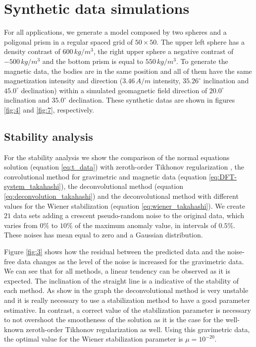 \section{Synthetic data simulations}
\label{sec:synthetic_simulations}

For all applications, we generate a model composed by two spheres and a poligonal prism in a regular spaced grid of $50 \times 50$. The upper left sphere has a density contrast of $600 \, kg/m^3$, the right upper sphere a negative contrast of $-500 \, kg/m^3$ and the bottom prism is equal to $550 \, kg/m^3$. To generate the magnetic data, the bodies are in the same position and all of them have the same magnetization intensity and direction ($3.46 \, A/m$ intensity, $35.26^{\circ}$ inclination and $45.0^{\circ}$ declination) within a simulated geomagnetic field direction of $20.0^{\circ}$ inclination and $35.0^{\circ}$ declination. These synthetic datas are shown in figures \ref{fig:4}
and \ref{fig:7}, respectively.

\subsection{Stability analysis}

For the stability analysis we show the comparison of the normal equations solution (equation \ref{eq:t_data}) with zeroth-order Tikhonov regularization \citep{aster2018parameter}, the convolutional method for gravimetric and magnetic data (equation \ref{eq:DFT-system_takahashi}), the deconvolutional method (equation \ref{eq:deconvolution_takahashi}) and the deconvolutional method with different values for the Wiener stabilization (equation \ref{eq:wiener_takahashi}). We create $21$ data sets adding a crescent pseudo-random noise to the original data, which varies from $0\%$ to $10\%$ of the maximum anomaly value, in intervals of $0.5\%$. These noises has mean equal to zero and a Gaussian distribution.
		
Figure \ref{fig:3} shows how the residual between the predicted data and the noise-free data changes as the level of the noise is increased for the gravimetric data. We can see that for all methods, a linear tendency can be observed as it is expected. The inclination of the straight line is a indicative of the stability of each method. As show in the graph the deconvolutional method is very unstable and it is really necessary to use a stabilization method to have a good parameter estimative. In contrast, a correct value of the stabilization parameter is necessary to not overshoot the smootheness of the solution as it is the case for the well-known zeroth-order Tikhonov regularization as well. Using this gravimetric data, the optimal value for the Wiener stabilization parameter is $\mu = 10^{-20}$. 

